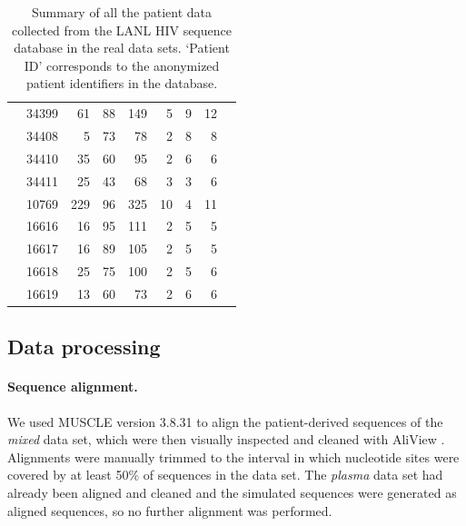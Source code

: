 \documentclass[12pt]{article}
\begin{document}
\begin{table}
\begin{center}
\begin{tabular}{llrrrrrrr}
& 34399 &      61 &       88 &      149 &        5 &        9 &       12 \\
& 34408 &       5 &       73 &       78 &        2 &        8 &        8 \\
& 34410 &      35 &       60 &       95 &        2 &        6 &        6 \\
& 34411 &      25 &       43 &       68 &        3 &        3 &        6   \\
\cite{Fischer04} & 10769 &    229 &       96 &      325 &       10 &        4 &       11 \\ 
\cite{Llewellyn06} & 16616 &     16 &       95 &      111 &        2 &        5 &        5 \\
& 16617 &     16 &       89 &      105 &        2 &        5 &        5 \\
& 16618 &     25 &       75 &      100 &        2 &        5 &        6 \\
& 16619 &     13 &       60 &       73 &        2 &        6 &        6 \\
\hline
\end{tabular}
\end{center}
  \caption{
  {Summary of all the patient data collected from the LANL HIV sequence database in the real data sets.}
  `Patient ID' corresponds to the anonymized patient identifiers in the database.
   }\label{tab:patients} 
\end{table}


\subsection * {Data processing}

\paragraph{Sequence alignment.} \label{subsec:seqalign}
We used MUSCLE version 3.8.31 \citep{Muscle04} to align the patient-derived sequences of the \emph{mixed} data set, which were then visually inspected and cleaned with AliView \citep{AliView14}. 
Alignments were manually trimmed to the interval in which nucleotide sites were covered by at least 50\% of sequences in the data set.
The \emph{plasma} data set had already been aligned and cleaned \citep{McCloskey14} and the simulated sequences were generated as aligned sequences, so no further alignment was performed.
\end{document}
